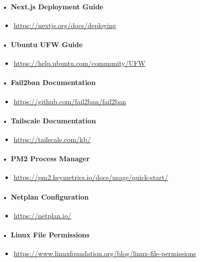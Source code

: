 \documentclass[12pt,a4paper]{report}
\begin{document}
\paragraph{• Next.js Deployment Guide}
\begin{itemize}[leftmargin=2em]
    \item \url{https://nextjs.org/docs/deploying}
\end{itemize}

\paragraph{• Ubuntu UFW Guide}
\begin{itemize}[leftmargin=2em]
    \item \url{https://help.ubuntu.com/community/UFW}
\end{itemize}

\paragraph{• Fail2ban Documentation}
\begin{itemize}[leftmargin=2em]
    \item \url{https://github.com/fail2ban/fail2ban}
\end{itemize}

\paragraph{• Tailscale Documentation}
\begin{itemize}[leftmargin=2em]
    \item \url{https://tailscale.com/kb/}
\end{itemize}

\paragraph{• PM2 Process Manager}
\begin{itemize}[leftmargin=2em]
    \item \url{https://pm2.keymetrics.io/docs/usage/quick-start/}
\end{itemize}

\paragraph{• Netplan Configuration}
\begin{itemize}[leftmargin=2em]
    \item \url{https://netplan.io/}
\end{itemize}

\paragraph{• Linux File Permissions}
\begin{itemize}[leftmargin=2em]
    \item \url{https://www.linuxfoundation.org/blog/linux-file-permissions}
\end{itemize}
\end{document}
